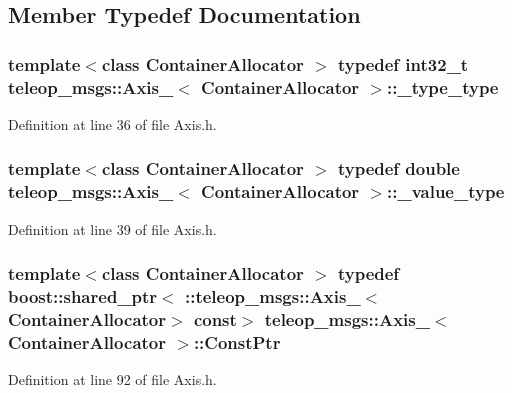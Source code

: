\subsection{Member Typedef Documentation}
\subsubsection[{\_\-type\_\-type}]{\setlength{\rightskip}{0pt plus 5cm}template$<$class ContainerAllocator $>$ typedef int32\_\-t {\bf teleop\_\-msgs::Axis\_\-}$<$ ContainerAllocator $>$::{\bf \_\-type\_\-type}}\label{structteleop__msgs_1_1Axis___a1f850898b601a8322e87cc85d7cb81c3}


Definition at line 36 of file Axis.h.

\subsubsection[{\_\-value\_\-type}]{\setlength{\rightskip}{0pt plus 5cm}template$<$class ContainerAllocator $>$ typedef double {\bf teleop\_\-msgs::Axis\_\-}$<$ ContainerAllocator $>$::{\bf \_\-value\_\-type}}\label{structteleop__msgs_1_1Axis___a19e99bd851d43261ea10a83c12a193b9}


Definition at line 39 of file Axis.h.

\subsubsection[{ConstPtr}]{\setlength{\rightskip}{0pt plus 5cm}template$<$class ContainerAllocator $>$ typedef boost::shared\_\-ptr$<$ ::{\bf teleop\_\-msgs::Axis\_\-}$<$ContainerAllocator$>$ const$>$ {\bf teleop\_\-msgs::Axis\_\-}$<$ ContainerAllocator $>$::{\bf ConstPtr}}\label{structteleop__msgs_1_1Axis___a11476169dfea09be1dcecd258cee1276}


Definition at line 92 of file Axis.h.

